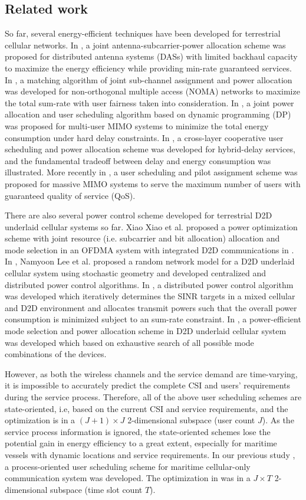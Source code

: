 \documentclass{ieeeaccess}
\begin{document}
\subsection{Related work}
So far, several energy-efficient techniques have been developed for terrestrial cellular networks.
In \cite{p3}, a joint antenna-subcarrier-power allocation scheme was proposed for distributed antenna systems (DASs) with limited backhaul capacity to maximize the energy efficiency while providing min-rate guaranteed services. In \cite{p6}, a matching algorithm of joint sub-channel assignment and power allocation was developed for non-orthogonal multiple access (NOMA) networks to maximize the total sum-rate with user fairness taken into consideration. In \cite{p4}, a joint power allocation and user scheduling algorithm based on dynamic programming (DP) was proposed for multi-user MIMO systems to minimize the total energy consumption under hard delay constraints. In \cite{p5}, a cross-layer cooperative user scheduling and power allocation scheme was developed for hybrid-delay services, and the fundamental tradeoff between delay and energy consumption was illustrated. More recently in \cite{p7}, a user scheduling and pilot assignment scheme was proposed for massive MIMO systems to serve the maximum number of users with guaranteed quality of service (QoS).

There are also several power control scheme developed for terrestrial D2D underlaid cellular systems so far. Xiao Xiao et al. proposed a power optimization scheme with joint resource (i.e. subcarrier and bit allocation) allocation and mode selection in an OFDMA system with integrated D2D communications in \cite{p104}. In \cite{p105}, Namyoon Lee et al. proposed a random network model for a D2D underlaid cellular system using stochastic geometry and developed centralized and distributed power control algorithms. In \cite{p106}, a distributed power control algorithm was developed which iteratively determines the SINR targets in a mixed cellular and D2D environment and allocates transmit powers such that the overall power consumption is minimized subject to an sum-rate constraint. In \cite{p107}, a power-efficient mode selection and power allocation scheme in D2D underlaid cellular system was developed which based on exhaustive search of all possible mode combinations of the devices.

However, as both the wireless channels and the service demand are time-varying, it is impossible to accurately predict the complete CSI and users' requirements during the service process. Therefore, all of the above user scheduling schemes are state-oriented, i.e, based on the current CSI and service requirements, and the optimization is in a ${\left( {J + 1} \right) \times J}$ 2-dimensional subspace (user count $J$). As the service process information is ignored, the state-oriented schemes lose the potential gain in energy efficiency to a great extent, especially for maritime vessels with dynamic locations and service requirements.
In our previous study \cite{p108}, a process-oriented user scheduling scheme for maritime cellular-only communication system was developed. The optimization in \cite{p108} was in a  ${J \times T}$ 2-dimensional subspace (time slot count $T$).
\end{document}
